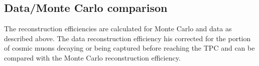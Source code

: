 \documentclass[a4paper,11pt]{article}
\begin{document}




\subsection{Data/Monte Carlo comparison}\label{sec:datamc}
The reconstruction efficiencies are calculated for Monte Carlo and data as described above. The data reconstruction efficiency his corrected for the portion of cosmic muons decaying or being captured before reaching the TPC and can be compared with the Monte Carlo reconstruction efficiency.
\end{document}
